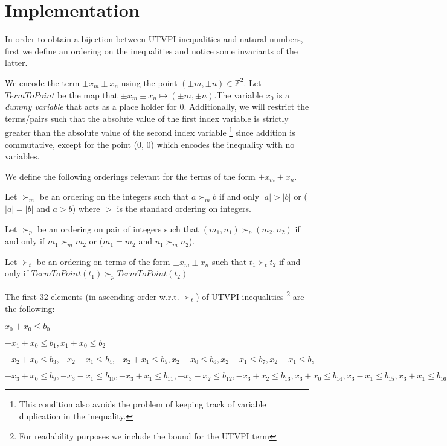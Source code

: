\section{Implementation}

In order to obtain a bijection between UTVPI inequalities and
natural numbers, first we define an ordering on the inequalities
and notice some invariants of the latter. 

We encode the term $\pm x_m \pm x_n$ using the point
$(\pm m, \pm n) \in \mathbb{Z}^2$. Let $TermToPoint$ be the map
that $\pm x_m \pm x_n \mapsto (\pm m, \pm n)$.The variable $x_0$ is a
\emph{dummy variable} that acts as a place holder for 0. 
Additionally, we will restrict the terms/pairs such that the absolute
value of the first index variable is strictly greater than the
absolute value of the second index variable \footnote{This condition also
  avoids the problem of keeping track of variable duplication in 
the inequality.} since addition is commutative, except for the point
(0, 0) which encodes the inequality with no variables.

We define the following orderings relevant for the terms of the form
$\pm x_m \pm x_n$.

\begin{definition} 
  Let $\succ_m$ be an ordering on the integers such that $a \succ_m b$
  if and only $|a| > |b|$ or ($|a| = |b|$ and $a > b$) where $>$ is the
  standard ordering on integers.

  Let $\succ_p$ be an ordering on pair of integers such that 
  $(m_1, n_1) \succ_p (m_2, n_2)$ if and only if $m_1 \succ_m m_2$
  or ($m_1 = m_2$ and $n_1 \succ_m n_2$).

  Let $\succ_t$ be an ordering on terms of the form $\pm x_m \pm x_n$
  such that $t_1 \succ_t t_2$ if and only if $TermToPoint(t_1) \succ_p TermToPoint(t_2)$
\end{definition}

\begin{example}
  The first 32 elements (in ascending order w.r.t. $\succ_t$) of UTVPI inequalities
  \footnote{For readability purposes we include the bound for the UTVPI term }
  are the following:

  $x_{0} + x_{0} \leq b_{0}$

  $-x_{1} + x_{0} \leq b_{1}, x_{1} + x_{0} \leq b_{2}$ 

  $-x_{2} + x_{0} \leq b_{3}, -x_{2} - x_{1} \leq b_{4}, -x_{2} + x_{1} \leq b_{5}, x_{2} + x_{0} \leq b_{6}, x_{2} - x_{1} \leq b_{7}, x_{2} + x_{1} \leq b_{8}$

  $-x_{3} + x_{0} \leq b_{9}, -x_{3} - x_{1} \leq b_{10}, -x_{3} + x_{1} \leq b_{11}, -x_{3} - x_{2} \leq b_{12}, -x_{3} + x_{2} \leq b_{13},x_{3} + x_{0} \leq b_{14}, x_{3} - x_{1} \leq b_{15}, x_{3} + x_{1} \leq b_{16}, x_{3} - x_{2} \leq b_{17}, x_{3} + x_{2} \leq b_{18}$
\end{example}

